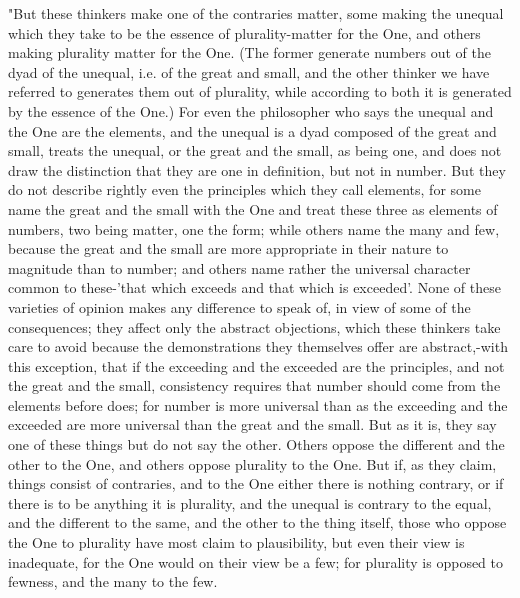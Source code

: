 "But these thinkers make one of the contraries matter, some making
the unequal which they take to be the essence of plurality-matter
for the One, and others making plurality matter for the One. (The
former generate numbers out of the dyad of the unequal, i.e. of the
great and small, and the other thinker we have referred to generates
them out of plurality, while according to both it is generated by
the essence of the One.) For even the philosopher who says the unequal
and the One are the elements, and the unequal is a dyad composed of
the great and small, treats the unequal, or the great and the small,
as being one, and does not draw the distinction that they are one
in definition, but not in number. But they do not describe rightly
even the principles which they call elements, for some name the great
and the small with the One and treat these three as elements of numbers,
two being matter, one the form; while others name the many and few,
because the great and the small are more appropriate in their nature
to magnitude than to number; and others name rather the universal
character common to these-'that which exceeds and that which is exceeded'.
None of these varieties of opinion makes any difference to speak of,
in view of some of the consequences; they affect only the abstract
objections, which these thinkers take care to avoid because the demonstrations
they themselves offer are abstract,-with this exception, that if the
exceeding and the exceeded are the principles, and not the great and
the small, consistency requires that number should come from the elements
before does; for number is more universal than as the exceeding and
the exceeded are more universal than the great and the small. But
as it is, they say one of these things but do not say the other. Others
oppose the different and the other to the One, and others oppose plurality
to the One. But if, as they claim, things consist of contraries, and
to the One either there is nothing contrary, or if there is to be
anything it is plurality, and the unequal is contrary to the equal,
and the different to the same, and the other to the thing itself,
those who oppose the One to plurality have most claim to plausibility,
but even their view is inadequate, for the One would on their view
be a few; for plurality is opposed to fewness, and the many to the
few. 

